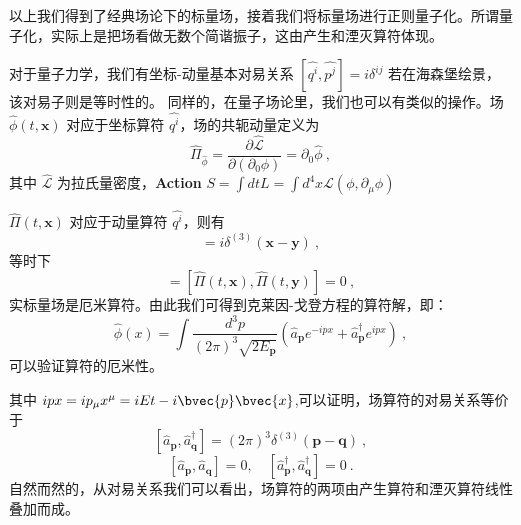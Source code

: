 \begin{corollary}{}
以上我们得到了经典场论下的标量场，接着我们将标量场进行正则量子化。所谓量子化，实际上是把场看做无数个简谐振子，这由产生和湮灭算符体现。

对于量子力学，我们有坐标-动量基本对易关系
$\left[\hat{q^{i}}, \hat{p^{j}}\right]=i \delta^{i j}$
若在海森堡绘景，该对易子则是等时性的。
同样的，在量子场论里，我们也可以有类似的操作。场 $\hat{\phi}(t, \mathbf{x})$ 对应于坐标算符 $\hat{q^{i}}$，场的共轭动量定义为
\begin{equation}
\hat{\Pi}_{\hat{\phi}}=\frac{\partial \hat{\mathcal{L}}}{\partial\left(\partial_{0} \phi\right)}=\partial_{0} \hat{\phi}~,
\end{equation}
其中 $\hat{\mathcal{L}}$ 为拉氏量密度，\textbf{Action} $S=\int d t L=\int d^{4} x \mathcal{L}\left(\phi, \partial_{\mu} \phi\right)$

$\hat{\Pi}(t, \mathbf{x})$ 对应于动量算符 $\hat{q^{i}}$，则有
\begin{equation}
[\hat{\phi}(t, \mathbf{x}), \hat{\Pi}(t, \mathbf{y})]=i \delta^{(3)}(\mathbf{x}-\mathbf{y})~,
\end{equation}
等时下
\begin{equation}
[\hat{\phi}(t, \mathbf{x}), \hat{\phi}(t, \mathbf{y})]=[\hat{\Pi}(t, \mathbf{x}), \hat{\Pi}(t, \mathbf{y})]=0~,
\end{equation}
实标量场是厄米算符。由此我们可得到克莱因-戈登方程的算符解，即：
\begin{equation}
\hat{\phi}(x)=\int \frac{d^{3} p}{(2 \pi)^{3} \sqrt{2 E_{\mathbf{p}}}}\left(\hat{a}_{\mathbf{p}} e^{-i p x}+\hat{a}_{\mathbf{p}}^{\dagger} e^{i p x}\right)~,
\end{equation}
可以验证算符的厄米性。

其中 $ipx=ip_\mu x^\mu=iEt-i\bvec{p}\bvec{x}$,可以证明，场算符的对易关系等价于
\begin{equation}
\left[\hat{a}_{\mathbf{p}}, \hat{a}_{\mathbf{q}}^{\dagger}\right]=(2 \pi)^{3} \delta^{(3)}(\mathbf{p}-\mathbf{q})~,
\end{equation}
\begin{equation}
\left[\hat{a}_{\mathbf{p}}, \hat{a}_{\mathbf{q}}\right]=0, \quad\left[\hat{a}_{\mathbf{p}}^{\dagger}, \hat{a}_{\mathbf{q}}^{\dagger}\right]=0~.
\end{equation}
自然而然的，从对易关系我们可以看出，场算符的两项由产生算符和湮灭算符线性叠加而成。
\end{corollary}
